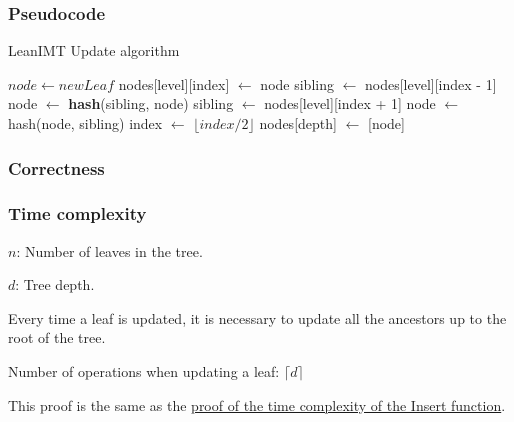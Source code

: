 \documentclass{article}
\begin{document}
\bigbreak

\subsubsection{Pseudocode}

\begin{algorithm}[H]
    \caption{LeanIMT Update algorithm}\label{update}
    \begin{algorithmic}[1]
        \State $node\gets newLeaf$
        \State nodes[level][index] $\gets$ node
         
        \State sibling $\gets$ nodes[level][index - 1]
        \State node $\gets$ \textbf{hash}(sibling, node)
        \Else {}
        \State sibling $\gets$ nodes[level][index + 1]
         
        \State node $\gets$ hash(node, sibling)
        \EndIf
        \EndIf
        \State index $\gets$ $\lfloor index/2 \rfloor$ 
        \EndFor
        \State nodes[depth] $\gets$ [node] 
        \EndProcedure
    \end{algorithmic}
\end{algorithm}

\bigbreak

\subsubsection{Correctness}

\bigbreak

\subsubsection{Time complexity}

\bigbreak

$n$: Number of leaves in the tree.

$d$: Tree depth.

\bigbreak

Every time a leaf is updated, it is necessary to update all the ancestors up to the root of the tree.

\bigbreak

Number of operations when updating a leaf: $\lceil d \rceil$

This proof is the same as the \hyperref[InsertProof]{proof of the time complexity of the Insert function}.
\end{document}
